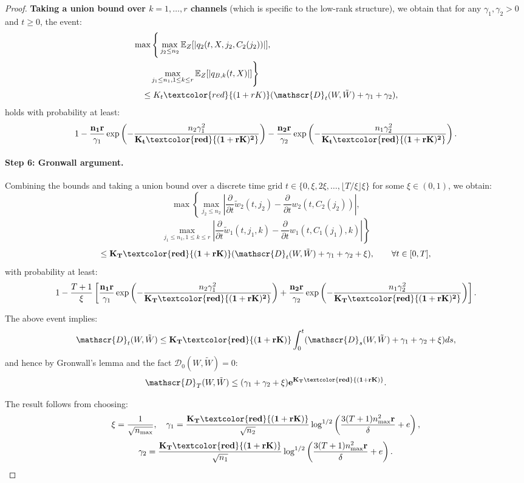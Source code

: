 \begin{proof}
\textbf{Taking a union bound over $k = 1, \ldots, r$ channels} (which is specific to the low-rank structure), we obtain that for any $\gamma_1, \gamma_2 > 0$ and $t \ge 0$, the event:
\begin{align*}
&\max\Bigg\{\max_{j_2 \le n_2}\mathbb{E}_Z[|q_2(t, X, j_2, C_2(j_2))|],\\
&\qquad\max_{j_1 \le n_1, 1 \le k \le r}\mathbb{E}_Z[|q_{B,k}(t, X)|]\Bigg\}\\
&\quad \le K_t\textcolor{red}{(1+rK)}(\mathscr{D}_t(W, \tilde{W}) + \gamma_1 + \gamma_2),
\end{align*}
holds with probability at least:
\[
1 - \frac{\mathbf{n_1r}}{\gamma_1}\exp\left(-\frac{n_2\gamma_1^2}{\mathbf{K_t\textcolor{red}{(1+rK)^2}}}\right) - \frac{\mathbf{n_2r}}{\gamma_2}\exp\left(-\frac{n_1\gamma_2^2}{\mathbf{K_t\textcolor{red}{(1+rK)^2}}}\right).
\]

\paragraph*{Step 6: Gronwall argument.}

Combining the bounds and taking a union bound over a discrete time grid $t \in \{0, \xi, 2\xi, \ldots, \lfloor T/\xi\rfloor\xi\}$ for some $\xi \in (0,1)$, we obtain:
\[
\max\left\{\max_{j_2 \le n_2}\left|\frac{\partial}{\partial t}\tilde{w}_2(t, j_2) - \frac{\partial}{\partial t}w_2(t, C_2(j_2))\right|,\right.
\]
\[
\left.\max_{j_1 \le n_1, 1 \le k \le r}\left|\frac{\partial}{\partial t}\tilde{w}_1(t, j_1, k) - \frac{\partial}{\partial t}w_1(t, C_1(j_1), k)\right|\right\}
\]
\[
\le \mathbf{K_T\textcolor{red}{(1+rK)}}(\mathscr{D}_t(W, \tilde{W}) + \gamma_1 + \gamma_2 + \xi), \qquad \forall t \in [0, T],
\]
with probability at least:
\[
1 - \frac{T+1}{\xi}\left[\frac{\mathbf{n_1r}}{\gamma_1}\exp\left(-\frac{n_2\gamma_1^2}{\mathbf{K_T\textcolor{red}{(1+rK)^2}}}\right) + \frac{\mathbf{n_2r}}{\gamma_2}\exp\left(-\frac{n_1\gamma_2^2}{\mathbf{K_T\textcolor{red}{(1+rK)^2}}}\right)\right].
\]

The above event implies:
\[
\mathscr{D}_t(W, \tilde{W}) \le \mathbf{K_T\textcolor{red}{(1+rK)}}\int_0^t(\mathscr{D}_s(W, \tilde{W}) + \gamma_1 + \gamma_2 + \xi)ds,
\]
and hence by Gronwall's lemma and the fact $\mathscr{D}_0(W, \tilde{W}) = 0$:
\[
\mathscr{D}_T(W, \tilde{W}) \le (\gamma_1 + \gamma_2 + \xi)\mathbf{e^{K_T\textcolor{red}{(1+rK)}}}.
\]

The result follows from choosing:
\[
\xi = \frac{1}{\sqrt{n_{\max}}}, \quad \gamma_1 = \frac{\mathbf{K_T\textcolor{red}{(1+rK)}}}{\sqrt{n_2}}\log^{1/2}\left(\frac{3(T+1)n_{\max}^2\mathbf{r}}{\delta} + e\right),
\]
\[
\gamma_2 = \frac{\mathbf{K_T\textcolor{red}{(1+rK)}}}{\sqrt{n_1}}\log^{1/2}\left(\frac{3(T+1)n_{\max}^2\mathbf{r}}{\delta} + e\right).
\]
\end{proof}

